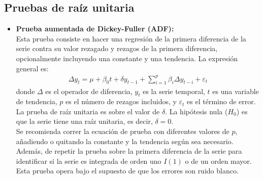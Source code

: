 \documentclass[12pt]{article}
\begin{document}




\subsection*{Pruebas de raíz unitaria}
\begin{itemize}
    \item \textbf{Prueba aumentada de Dickey-Fuller (ADF):} \\
    Esta prueba consiste en hacer una regresión de la primera diferencia 
    de la serie contra su valor rezagado y rezagos de la primera diferencia, 
    opcionalmente incluyendo una constante y una tendencia. La expresión 
    general es:
    \begin{align}
        \Delta y_t = \mu + \beta_0 t + \delta y_{t-1} + \sum_{i=1}^{p} \beta_i \Delta y_{t-i} + \varepsilon_t
    \end{align}
    donde $\Delta$ es el operador de diferencia, $y_t$ es la serie temporal,
    $t$ es una variable de tendencia, $p$ es el número de rezagos incluidos,
    y $\varepsilon_t$ es el término de error. La prueba de raíz unitaria es 
    sobre el valor de $\delta$. La hipótesis nula ($H_0$) es que la serie tiene una raíz
    unitaria, es decir, $\delta=0$.\\
    Se recomienda correr la ecuación de prueba con diferentes valores de $p$,
    añadiendo o quitando la constante y la tendencia según sea necesario. Además,
    de repetir la prueba sobre la primera diferencia de la serie para identificar
    si la serie es integrada de orden uno $I(1)$ o de un orden mayor.\\
    Esta prueba opera bajo el supuesto de que los errores son ruido blanco.


\end{itemize}
\end{document}

